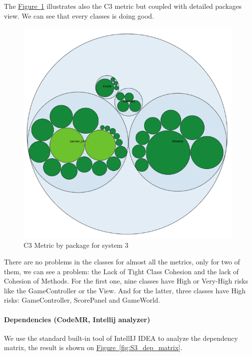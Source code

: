 \documentclass[]{article}
\newcommand{\wordlink}[2]{\hyperref[#2]{#1~\ref{#2}}}
\begin{document}
The \wordlink{Figure}{fig:S3_codeMR_packages} illustrates also the C3 metric but coupled with detailed packages view. We can see that every classes is doing good. 
\vspace{0.2cm}
\begin{figure}[h]
\centering
\includegraphics[width=0.8\linewidth]{S3_codeMR_packages.png}
\caption{C3 Metric by package for system 3}
\label{fig:S3_codeMR_packages}
\end{figure}

There are no problems in the classes for almost all the metrics, only for two of them, we can see a problem: the Lack of Tight Class Cohesion  and the lack of Cohesion of Methods. 
For the first one, nine classes have High or Very-High risks like the GameController or the View. And for the latter, three classes have High risks: GameController, ScorePanel and GameWorld.

  
\newpage

\paragraph{Dependencies (CodeMR, Intellij analyzer)}


We use the standard built-in tool of IntellIJ IDEA to analyze the dependency matrix, the result is shown on  \wordlink{Figure}{fig:S3_dep_matrix}. 
\end{document}
